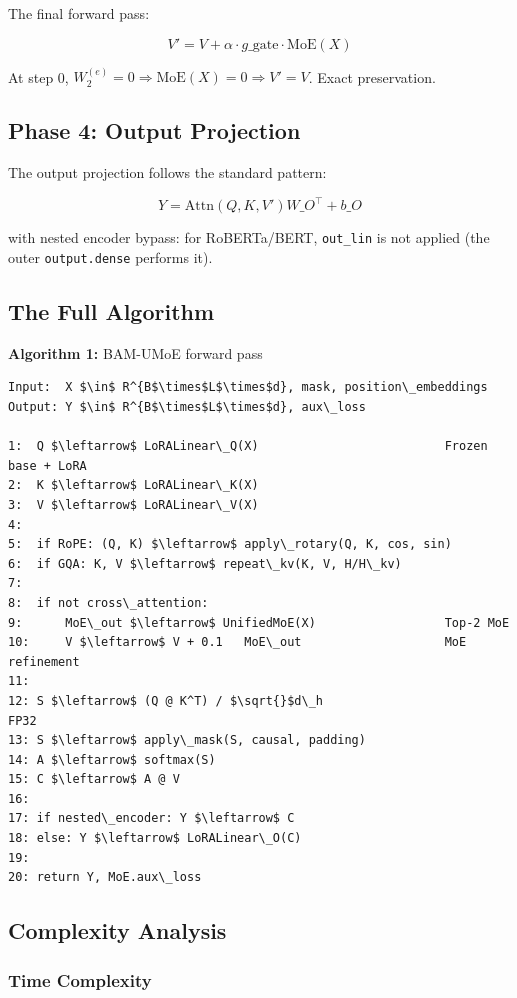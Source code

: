 The final forward pass:

\[
V' = V + \alpha \cdot g\_\text{gate} \cdot \text{MoE}(X)
\]

At step 0, $W_2^{(e)} = 0 \Rightarrow \text{MoE}(X) = 0 \Rightarrow V' = V$. 
Exact preservation.

\subsection{Phase 4: Output Projection}

The output projection follows the standard pattern:

\[
Y = \text{Attn}(Q, K, V') W\_O^\top + b\_O
\]

with nested encoder bypass: for RoBERTa/BERT, \texttt{out\_lin} is not applied 
(the outer \texttt{output.dense} performs it).

\subsection{The Full Algorithm}

\textbf{Algorithm 1:} BAM-UMoE forward pass
\begin{lstlisting}
Input:  X $\in$ R^{B$\times$L$\times$d}, mask, position\_embeddings
Output: Y $\in$ R^{B$\times$L$\times$d}, aux\_loss

1:  Q $\leftarrow$ LoRALinear\_Q(X)                          Frozen base + LoRA
2:  K $\leftarrow$ LoRALinear\_K(X)
3:  V $\leftarrow$ LoRALinear\_V(X)
4:
5:  if RoPE: (Q, K) $\leftarrow$ apply\_rotary(Q, K, cos, sin)
6:  if GQA: K, V $\leftarrow$ repeat\_kv(K, V, H/H\_kv)
7:
8:  if not cross\_attention:
9:      MoE\_out $\leftarrow$ UnifiedMoE(X)                  Top-2 MoE
10:     V $\leftarrow$ V + 0.1   MoE\_out                    MoE refinement
11:
12: S $\leftarrow$ (Q @ K^T) / $\sqrt{}$d\_h                         FP32
13: S $\leftarrow$ apply\_mask(S, causal, padding)
14: A $\leftarrow$ softmax(S)
15: C $\leftarrow$ A @ V
16:
17: if nested\_encoder: Y $\leftarrow$ C
18: else: Y $\leftarrow$ LoRALinear\_O(C)
19:
20: return Y, MoE.aux\_loss
\end{lstlisting}

\subsection{Complexity Analysis}

\subsubsection{Time Complexity}

